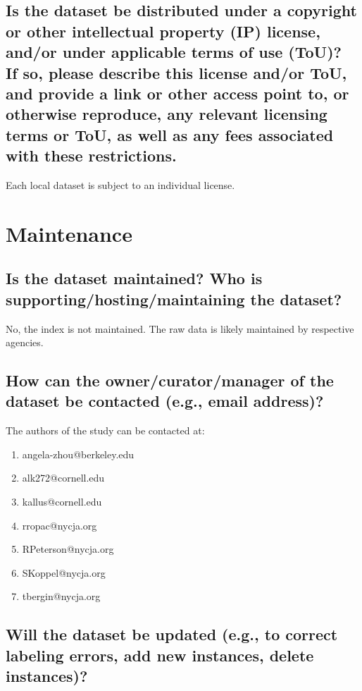 \documentclass[letterpaper, 10 pt, conference]{ieeeconf}  %
\newcommand{\subtitle}[1]{{\\ \small \normalfont \color{purple} #1}}
\begin{document}
\subsection{Is the dataset be distributed under a copyright or other intellectual property (IP) license, and/or under applicable terms of use (ToU)? \subtitle{If so, please describe this license and/or ToU, and provide a link or other access point to, or otherwise reproduce, any relevant licensing terms or ToU, as well as any fees associated with these restrictions.}}

Each local dataset is subject to an individual license. 

\section{Maintenance}

\subsection{Is the dataset maintained? Who is supporting/hosting/maintaining the dataset?}

No, the index is not maintained. The raw data is likely maintained by respective agencies. 

\subsection{How can the owner/curator/manager of the dataset be contacted (e.g., email address)?}

The authors of the study \cite{zhou2021empirical} can be contacted at:
\begin{enumerate}
    \item angela-zhou@berkeley.edu
    \item alk272@cornell.edu
    \item kallus@cornell.edu
    \item rropac@nycja.org
    \item RPeterson@nycja.org
    \item SKoppel@nycja.org
    \item tbergin@nycja.org
\end{enumerate}


\subsection{Will the dataset be updated (e.g., to correct labeling errors, add new instances, delete instances)?}
\end{document}

